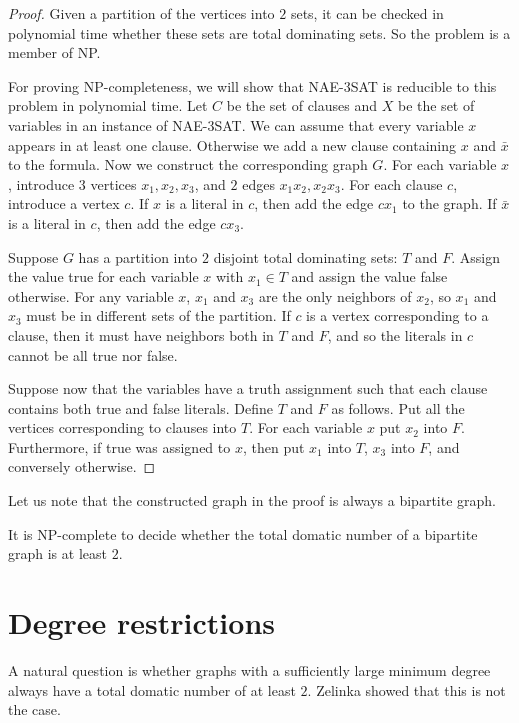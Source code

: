 \begin{proof}
  Given a partition of the vertices into $2$ sets, it can be checked in polynomial
  time whether these sets are total dominating sets. So the problem is a member
  of NP.

  For proving NP-completeness, we will show that NAE-3SAT is reducible to this problem
  in polynomial time. Let $C$ be the set of clauses and $X$ be the set of variables
  in an instance of NAE-3SAT. We can assume that every variable $x$ appears in at least
  one clause. Otherwise we add a new clause containing $x$ and $\bar{x}$ to
  the formula. Now we construct the corresponding graph $G$. For each variable $x$,
  introduce $3$ vertices $x_1, x_2, x_3$, and $2$ edges $x_1x_2, x_2x_3$. For each
  clause $c$, introduce a vertex $c$. If $x$ is a literal in $c$, then add the edge
  $cx_1$ to the graph. If $\bar{x}$ is a literal in $c$, then add the edge $cx_3$.

  Suppose $G$ has a partition into $2$ disjoint total dominating sets: $T$ and $F$.
  Assign the value true for each variable $x$ with $x_1 \in T$ and assign the value
  false otherwise. For any variable $x$, $x_1$ and $x_3$ are the only neighbors
  of $x_2$, so $x_1$ and $x_3$ must be in different sets of the partition. If $c$
  is a vertex corresponding to a clause, then it must have neighbors both in $T$
  and $F$, and so the literals in $c$ cannot be all true nor false.

  Suppose now that the variables have a truth assignment such that each clause
  contains both true and false literals. Define $T$ and $F$ as follows. Put all
  the vertices corresponding to clauses into $T$. For each variable $x$ put $x_2$
  into $F$. Furthermore, if true was assigned to $x$, then put $x_1$ into $T$, $x_3$
  into $F$, and conversely otherwise.
\end{proof}

Let us note that the constructed graph in the proof is always a bipartite
graph.

\begin{cor}
  It is NP-complete to decide whether the total domatic number of
  a bipartite graph is at least $2$.
\end{cor}

\section{Degree restrictions}

A natural question is whether graphs with a sufficiently large minimum degree
always have a total domatic number of at least $2$. Zelinka \cite{zelinka} showed
that this is not the case.

